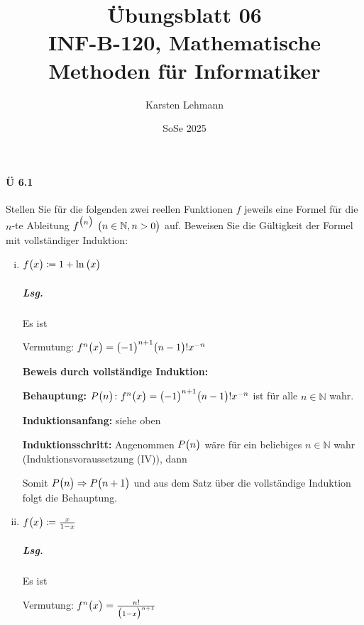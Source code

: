 \documentclass{scrreprt}
\author{Karsten Lehmann}
\date{SoSe 2025}
\title{Übungsblatt 06\\INF-B-120, Mathematische Methoden für Informatiker}
\begin{document}
\paragraph{Ü 6.1} Stellen Sie für die folgenden zwei reellen Funktionen $f$
jeweils eine Formel für die $n$-te Ableitung $f^\qty\big(n)$
$\qty\big(n \in \mathbb{N}, n > 0)$ auf.
Beweisen Sie die Gültigkeit der Formel mit vollständiger Induktion:
\begin{enumerate}[(i)]
\item $f\qty\big(x) \coloneqq 1 + \ln\qty\big(x)$

  \subparagraph{Lsg.} Es ist
  Vermutung: $f^{n}\qty\big(x) = \qty\big(-1)^{n + 1}\qty\big(n - 1)!x^{-n}$

  \textbf{Beweis durch vollständige Induktion:}

  \textbf{Behauptung:} $P\qty\big(n) \colon f^{n} \qty\big(x) = \qty\big(-1)^{n + 1}\qty\big(n - 1)!x^{-n}$
  ist für alle $n \in \mathbb{N}$ wahr.

  \textbf{Induktionsanfang:} siehe oben

  \textbf{Induktionsschritt:} Angenommen $P\qty\big(n)$ wäre für ein beliebiges
  $n \in \mathbb{N}$ wahr (Induktionsvoraussetzung (IV)), dann
  Somit $P\qty\big(n) \Rightarrow P\qty\big(n + 1)$ und aus dem Satz über die
  vollständige Induktion folgt die Behauptung.

\item $f\qty\big(x) \coloneqq \frac{x}{1 - x}$

  \subparagraph{Lsg.} Es ist
  Vermutung: $f^{n}\qty\big(x) = \frac{n!}{\qty\big(1 - x)^{n + 1}}$


\end{enumerate}
\end{document}

